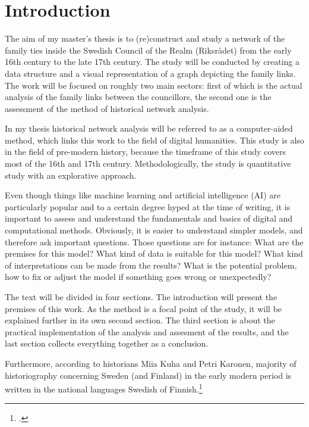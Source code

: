 \section{Introduction}
The aim of my master's thesis is to (re)construct and study a network of the family ties inside the Swedish Council of the Realm (Riksrådet) from the early 16th century to the late 17th century. The study will be conducted by creating a data structure and a visual representation of a graph depicting the family links. The work will be focused on roughly two main sectors: first of which is the actual analysis of the family links between the councillors, the second one is the assessment of the method of historical network analysis. 

In my thesis historical network analysis will be referred to as a computer-aided method, which links this work to the field of digital humanities. This study is also in the field of pre-modern history, because the timeframe of this study covers most of the 16th and 17th century. Methodologically, the study is quantitative study with an explorative approach.

Even though things like machine learning and artificial intelligence (AI) are particularly popular and to a certain degree hyped at the time of writing, it is important to assess and understand the fundamentals and basics of digital and computational methods. Obviously, it is easier to understand simpler models, and therefore ask important questions. Those questions are for instance: What are the premises for this model? What kind of data is suitable for this model? What kind of interpretations can be made from the results? What is the potential problem, how to fix or adjust the model if something goes wrong or unexpectedly?

The text will be divided in four sections. The introduction will present the premises of this work. As the method is a focal point of the study, it will be explained further in its own second section. The third section is about the practical implementation of the analysis and assesment of the results, and the last section collects everything together as a conclusion. 

Furthermore, according to historians Miia Kuha and Petri Karonen, majority of historiography concerning Sweden (and Finland) in the early modern period is written in the national languages Swedish of Finnish.\footcite[p. 6.]{kuha-ja-karonen} 


